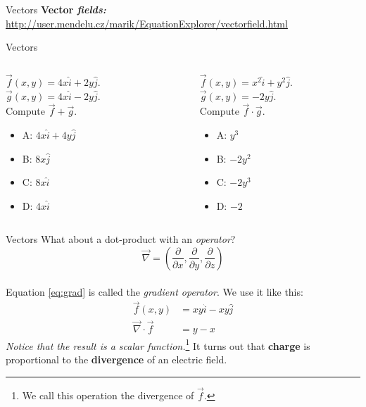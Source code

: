 \documentclass{beamer}
\begin{document}
\begin{frame}{Vectors}
\textbf{Vector \textit{fields:}} \\
\url{http://user.mendelu.cz/marik/EquationExplorer/vectorfield.html}
\end{frame}

\begin{frame}{Vectors}
\small
\begin{columns}[T]
\begin{column}{0.5\textwidth}
$\vec{f}(x,y) = 4x\hat{i}+2y\hat{j}$.  $\vec{g}(x,y) = 4x\hat{i}-2y\hat{j}$.  \\
Compute $\vec{f} + \vec{g}$.
\vspace{0.2cm}
\begin{itemize}
\item A: $4x\hat{i}+4y\hat{j}$
\item B: $8x\hat{j}$
\item C: $8x\hat{i}$
\item D: $4x\hat{i}$
\end{itemize}
\end{column}
\begin{column}{0.5\textwidth}
$\vec{f}(x,y) = x^2\hat{i}+y^2\hat{j}$.  $\vec{g}(x,y) = -2y\hat{j}$.  \\
Compute $\vec{f} \cdot \vec{g}$.
\vspace{0.2cm}
\begin{itemize}
\item A: $y^3$
\item B: $-2y^2$
\item C: $-2y^3$
\item D: $-2$
\end{itemize}
\end{column}
\end{columns}
\end{frame}

\begin{frame}{Vectors}
What about a dot-product with an \textit{operator}?\\
\begin{equation}
\vec{\nabla} = \left(\frac{\partial}{\partial x},\frac{\partial}{\partial y},\frac{\partial}{\partial z}\right) \label{eq:grad}
\end{equation} \\
Equation \ref{eq:grad} is called the \textit{gradient operator}.  We use it like this:
\begin{align}
\vec{f}(x,y) &= xy \hat{i} - xy \hat{j}\\
\vec{\nabla} \cdot \vec{f} &= y - x
\end{align}
\textit{Notice that the result is a scalar function.}\footnote{We call this operation the divergence of $\vec{f}$.}  It turns out that \textbf{charge} is proportional to the \textbf{divergence} of an electric field.
\end{frame}
\end{document}
